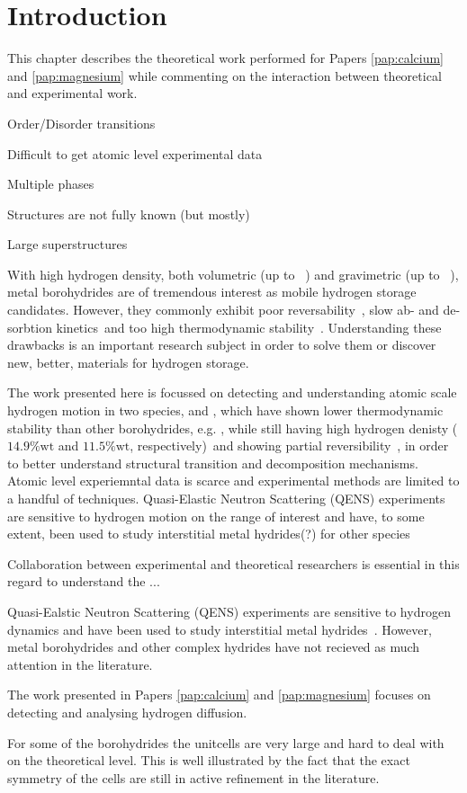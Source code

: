 \section{Introduction}
\label{sec:borohydrides-introduction}

This chapter describes the theoretical work performed for Papers \ref{pap:calcium} and \ref{pap:magnesium} while commenting on the interaction between theoretical and experimental work.

\bit
\item Order/Disorder transitions
\item Difficult to get atomic level experimental data
\item Multiple phases
\item Structures are not fully known (but mostly)
\item Large superstructures
\eit

With high hydrogen density, both volumetric (up to \missing{}~\citemiss) and gravimetric (up to \missing{}~\citemiss), metal borohydrides are of tremendous interest as mobile hydrogen storage candidates.
However, they commonly exhibit poor reversability~\citemiss, slow ab- and de-sorbtion kinetics~\citemiss and too high thermodynamic stability~\citemiss.
Understanding these drawbacks is an important research subject in order to solve them or discover new, better, materials for hydrogen storage.

The work presented here is focussed on detecting and understanding atomic scale hydrogen motion in two species,  and , which have shown lower thermodynamic stability than other borohydrides, e.g. , while still having high hydrogen denisty ($14.9\%\text{wt}$ and $11.5\%\text{wt}$, respectively)~\citemiss and showing partial reversibility~\citemiss, in order to better understand structural transition and decomposition mechanisms.
Atomic level experiemntal data is scarce and experimental methods are limited to a handful of techniques.
Quasi-Elastic Neutron Scattering (QENS) experiments are sensitive to hydrogen motion on the range of interest and have, to some extent, been used to study interstitial metal hydrides(?) for other species

Collaboration between experimental and theoretical researchers is essential in this regard to understand the ...

Quasi-Ealstic Neutron Scattering (QENS) experiments are sensitive to hydrogen dynamics and have been used to study interstitial metal hydrides~\citemiss.
However, metal borohydrides and other complex hydrides have not recieved as much attention in the literature.

The work presented in Papers \ref{pap:calcium} and \ref{pap:magnesium} focuses on detecting and analysing hydrogen diffusion.

For some of the borohydrides the unitcells are very large and hard to deal with on the theoretical level.
This is well illustrated by the fact that the exact symmetry of the cells are still in active refinement in the literature.~\citemiss

\incomplete
